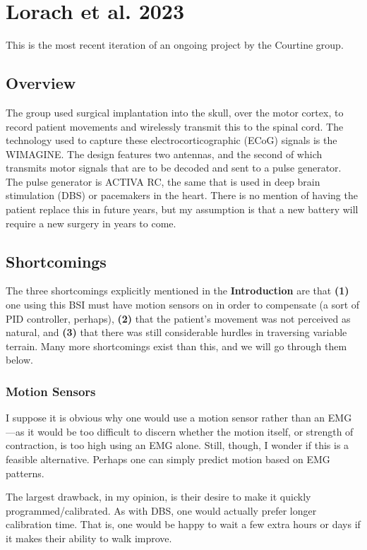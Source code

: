 \documentclass[12pt]{report}
\begin{document}
\section{Lorach et al. 2023} This is the most recent iteration of an ongoing project by the Courtine group. 

\subsection{Overview} The group used surgical implantation into the skull, over the motor cortex, to record patient movements and wirelessly transmit this to the spinal cord. The technology used to capture these electrocorticographic (ECoG) signals is the WIMAGINE. The design features two antennas, and the second of which transmits motor signals that are to be decoded and sent to a pulse generator. The pulse generator is ACTIVA RC, the same that is used in deep brain stimulation (DBS) or pacemakers in the heart. There is no mention of having the patient replace this in future years, but my assumption is that a new battery will require a new surgery in years to come. 


\subsection{Shortcomings} The three shortcomings explicitly mentioned in the \textbf{Introduction} are that \textbf{(1)} one using this BSI must have motion sensors on in order to compensate (a sort of PID controller, perhaps),  \textbf{(2)} that the patient's movement was not perceived as natural, and \textbf{(3)} that there was still considerable hurdles in traversing variable terrain. Many more shortcomings exist than this, and we will go through them below.

\subsubsection{Motion Sensors} I suppose it is obvious why one would use a motion sensor rather than an EMG---as it would be too difficult to discern whether the motion itself, or strength of contraction, is too high using an EMG alone. Still, though, I wonder if this is a feasible alternative. Perhaps one can simply predict motion based on EMG patterns.\newline

The largest drawback, in my opinion, is their desire to make it quickly programmed/calibrated. As with DBS, one would actually prefer longer calibration time. That is, one would be happy to wait a few extra hours or days if it makes their ability to walk improve.\newline
\end{document}
